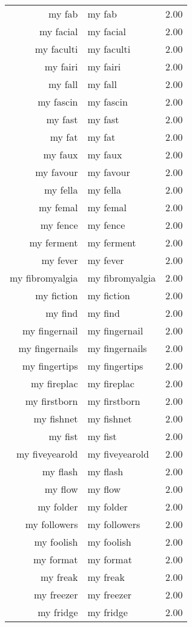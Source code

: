 \begin{table}[ht]
\begin{tabular}{rlr}
  my fab & my fab & 2.00 \\ 
  my facial & my facial & 2.00 \\ 
  my faculti & my faculti & 2.00 \\ 
  my fairi & my fairi & 2.00 \\ 
  my fall & my fall & 2.00 \\ 
  my fascin & my fascin & 2.00 \\ 
  my fast & my fast & 2.00 \\ 
  my fat & my fat & 2.00 \\ 
  my faux & my faux & 2.00 \\ 
  my favour & my favour & 2.00 \\ 
  my fella & my fella & 2.00 \\ 
  my femal & my femal & 2.00 \\ 
  my fence & my fence & 2.00 \\ 
  my ferment & my ferment & 2.00 \\ 
  my fever & my fever & 2.00 \\ 
  my fibromyalgia & my fibromyalgia & 2.00 \\ 
  my fiction & my fiction & 2.00 \\ 
  my find & my find & 2.00 \\ 
  my fingernail & my fingernail & 2.00 \\ 
  my fingernails & my fingernails & 2.00 \\ 
  my fingertips & my fingertips & 2.00 \\ 
  my fireplac & my fireplac & 2.00 \\ 
  my firstborn & my firstborn & 2.00 \\ 
  my fishnet & my fishnet & 2.00 \\ 
  my fist & my fist & 2.00 \\ 
  my fiveyearold & my fiveyearold & 2.00 \\ 
  my flash & my flash & 2.00 \\ 
  my flow & my flow & 2.00 \\ 
  my folder & my folder & 2.00 \\ 
  my followers & my followers & 2.00 \\ 
  my foolish & my foolish & 2.00 \\ 
  my format & my format & 2.00 \\ 
  my freak & my freak & 2.00 \\ 
  my freezer & my freezer & 2.00 \\ 
  my fridge & my fridge & 2.00 \\ 

\end{tabular}
\end{table}
